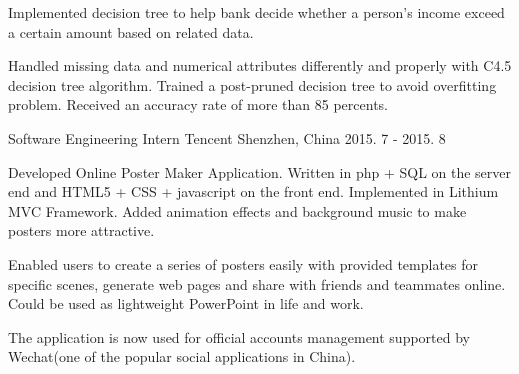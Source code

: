 \begin{cventries}
{\begin{cvitems}
        \item{Implemented decision tree to help bank decide whether a person's income exceed a certain amount based on related data.}
        \item{Handled missing data and numerical attributes differently and properly with C4.5 decision tree algorithm. Trained a post-pruned decision tree to avoid overfitting problem. Received an accuracy rate of more than 85 percents.}
      \end{cvitems}
    }
  \cventry
    {Software Engineering Intern}
    {Tencent}
    {Shenzhen, China}
    {2015. 7 - 2015. 8}
    {
      \begin{cvitems}
        \item {Developed Online Poster Maker Application. Written in php + SQL on the server end and HTML5 + CSS + javascript on the front end. Implemented in Lithium MVC Framework. Added animation effects and background music to make posters more attractive.}
        \item {Enabled users to create a series of posters easily with provided templates for specific scenes, generate web pages and share with friends and teammates online. Could be used as lightweight PowerPoint in life and work.}
        \item {The application is now used for official accounts management supported by Wechat(one of the popular social applications in China).}
      \end{cvitems}
    }
  
\end{cventries}
